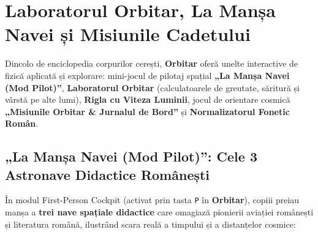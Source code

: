 \chapter{Laboratorul Orbitar, La Manșa Navei și Misiunile Cadetului}
\label{chap:laborator}

Dincolo de enciclopedia corpurilor cerești, \textbf{Orbitar} oferă unelte interactive de fizică aplicată și explorare: mini-jocul de pilotaj spațial \textbf{„La Manșa Navei (Mod Pilot)”}, \textbf{Laboratorul Orbitar} (calculatoarele de greutate, săritură și vârstă pe alte lumi), \textbf{Rigla cu Viteza Luminii}, jocul de orientare cosmică \textbf{„Misiunile Orbitar \& Jurnalul de Bord”} și \textbf{Normalizatorul Fonetic Român}.

\section{„La Manșa Navei (Mod Pilot)”: Cele 3 Astronave Didactice Românești}

În modul First-Person Cockpit (activat prin tasta \texttt{P} în \textbf{Orbitar}), copiii preiau manșa a \textbf{trei nave spațiale didactice} care omagiază pionierii aviației românești și literatura română, ilustrând scara reală a timpului și a distanțelor cosmice:

